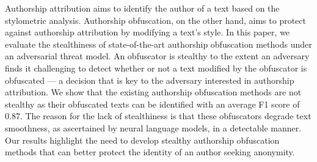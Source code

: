 Authorship attribution aims to identify the author of a text based on the stylometric analysis. Authorship obfuscation, on the other hand, aims to protect against authorship attribution by modifying a text's style. In this paper, we evaluate the stealthiness of state-of-the-art authorship obfuscation methods under an adversarial threat model. An obfuscator is stealthy to the extent an adversary finds it challenging to detect whether or not a text modified by the obfuscator is obfuscated --- a decision that is key to the adversary interested in authorship attribution. We show that the existing authorship obfuscation methods are not stealthy as their obfuscated texts can be identified with an average F1 score of 0.87. The reason for the lack of stealthiness is that these obfuscators degrade text smoothness, as ascertained by neural language models, in a detectable manner. Our results highlight the need to develop stealthy authorship obfuscation methods that can better protect the identity of an author seeking anonymity.
